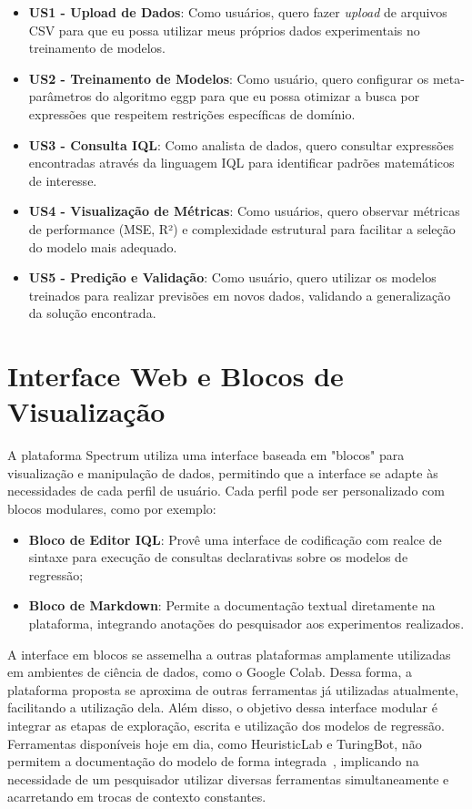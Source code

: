 \begin{itemize}
    \item \textbf{US1 - Upload de Dados}: Como usuários, quero fazer \textit{upload} de arquivos CSV para que eu possa utilizar meus próprios dados experimentais no treinamento de modelos.
    \item \textbf{US2 - Treinamento de Modelos}: Como usuário, quero configurar os meta-parâmetros do algoritmo eggp para que eu possa otimizar a busca por expressões que respeitem restrições específicas de domínio.
    \item \textbf{US3 - Consulta IQL}: Como analista de dados, quero consultar expressões encontradas através da linguagem IQL para identificar padrões matemáticos de interesse.
    \item \textbf{US4 - Visualização de Métricas}: Como usuários, quero observar métricas de performance (MSE, R²) e complexidade estrutural para facilitar a seleção do modelo mais adequado.
    \item \textbf{US5 - Predição e Validação}: Como usuário, quero utilizar os modelos treinados para realizar previsões em novos dados, validando a generalização da solução encontrada.
\end{itemize}

\section{Interface Web e Blocos de Visualização}
A plataforma Spectrum utiliza uma interface baseada em "blocos" para visualização e manipulação de dados, permitindo que a interface se adapte às necessidades de cada perfil de usuário. Cada perfil pode ser personalizado com blocos modulares, como por exemplo:
\begin{itemize}
    \item \textbf{Bloco de Editor IQL}: Provê uma interface de codificação com realce de sintaxe para execução de consultas declarativas sobre os modelos de regressão;
    \item \textbf{Bloco de Markdown}: Permite a documentação textual diretamente na plataforma, integrando anotações do pesquisador aos experimentos realizados.
\end{itemize}

A interface em blocos se assemelha a outras plataformas amplamente utilizadas em ambientes de ciência de dados, como o Google Colab. Dessa forma, a plataforma proposta se aproxima de outras ferramentas já utilizadas atualmente, facilitando a utilização dela. Além disso, o objetivo dessa interface modular é integrar as etapas de exploração, escrita e utilização dos modelos de regressão. Ferramentas disponíveis hoje em dia, como HeuristicLab e TuringBot, não permitem a documentação do modelo de forma integrada~\cite{heuristiclabDocumentationAboutHeuristicLabx2013,turingbot2020}, implicando na necessidade de um pesquisador utilizar diversas ferramentas simultaneamente e acarretando em trocas de contexto constantes.

